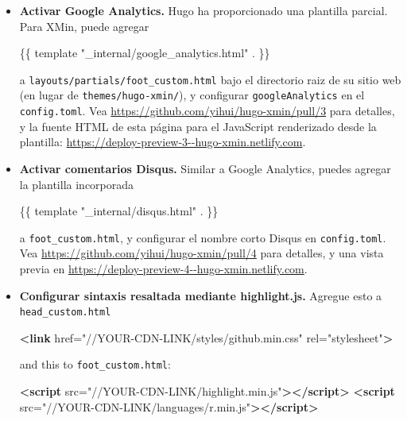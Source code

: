 \documentclass[12pt,]{krantz}
\makeatletter
\newenvironment{Shaded}{\begin{snugshade}}{\end{snugshade}}
\newcommand{\KeywordTok}[1]{\textcolor[rgb]{0.13,0.29,0.53}{\textbf{#1}}}
\newcommand{\NormalTok}[1]{#1}
\newcommand{\OtherTok}[1]{\textcolor[rgb]{0.56,0.35,0.01}{#1}}
\newcommand{\StringTok}[1]{\textcolor[rgb]{0.31,0.60,0.02}{#1}}
\newenvironment{kframe}{%
\medskip{}
\setlength{\fboxsep}{.8em}
 \def\at@end@of@kframe{}%
 \ifinner\ifhmode%
  \def\at@end@of@kframe{\end{minipage}}%
  \begin{minipage}{\columnwidth}%
 \fi\fi%
 \def\FrameCommand##1{\hskip\@totalleftmargin \hskip-\fboxsep
 \colorbox{shadecolor}{##1}\hskip-\fboxsep
     \hskip-\linewidth \hskip-\@totalleftmargin \hskip\columnwidth}%
 \MakeFramed {\advance\hsize-\width
   \@totalleftmargin\z@ \linewidth\hsize
   \@setminipage}}%
 {\par\unskip\endMakeFramed%
 \at@end@of@kframe}
\renewenvironment{Shaded}{\begin{kframe}}{\end{kframe}}
\theoremstyle{definition}
\theoremstyle{definition}
\theoremstyle{definition}
\theoremstyle{remark}
\makeatother
\begin{document}
\begin{itemize}
\item
  \textbf{Activar Google Analytics.} Hugo ha
  proporcionado una plantilla parcial. Para XMin, puede agregar

\begin{Shaded}
\begin{Highlighting}[]
\NormalTok{\{\{ template "_internal/google_analytics.html" . \}\}}
\end{Highlighting}
\end{Shaded}

  a \texttt{layouts/partials/foot\_custom.html} bajo el directorio raiz
  de su sitio web (en lugar de \texttt{themes/hugo-xmin/}), y configurar
  \texttt{googleAnalytics} en el \texttt{config.toml}. Vea
  \url{https://github.com/yihui/hugo-xmin/pull/3} para detalles, y la
  fuente HTML de esta página para el JavaScript renderizado desde la
  plantilla: \url{https://deploy-preview-3--hugo-xmin.netlify.com}.
\item
  \textbf{Activar comentarios Disqus.} Similar a Google
  Analytics, puedes agregar la plantilla
  incorporada

\begin{Shaded}
\begin{Highlighting}[]
\NormalTok{\{\{ template "_internal/disqus.html" . \}\}}
\end{Highlighting}
\end{Shaded}

  a \texttt{foot\_custom.html}, y configurar el nombre corto Disqus en
  \texttt{config.toml}. Vea
  \url{https://github.com/yihui/hugo-xmin/pull/4} para detalles, y una
  vista previa en \url{https://deploy-preview-4--hugo-xmin.netlify.com}.
\item
  \textbf{Configurar sintaxis resaltada mediante highlight.js.} Agregue
  esto a \texttt{head\_custom.html}

\begin{Shaded}
\begin{Highlighting}[]
\KeywordTok{<link}\OtherTok{ href=}\StringTok{"//YOUR-CDN-LINK/styles/github.min.css"}\OtherTok{ rel=}\StringTok{"stylesheet"}\KeywordTok{>}
\end{Highlighting}
\end{Shaded}

  and this to \texttt{foot\_custom.html}:

\begin{Shaded}
\begin{Highlighting}[]
\KeywordTok{<script}\OtherTok{ src=}\StringTok{"//YOUR-CDN-LINK/highlight.min.js"}\KeywordTok{></script>}
\KeywordTok{<script}\OtherTok{ src=}\StringTok{"//YOUR-CDN-LINK/languages/r.min.js"}\KeywordTok{></script>}


\end{Highlighting}
\end{Shaded}
\end{itemize}
\end{document}
